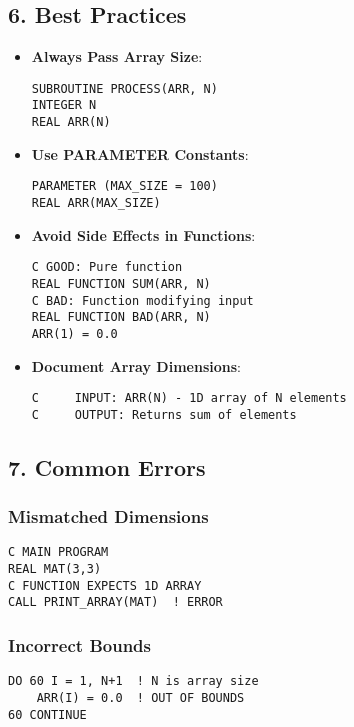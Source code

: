 \documentclass{book}
\begin{document}
\subsection*{6. Best Practices}
\begin{itemize}
\item \textbf{Always Pass Array Size}:
\begin{verbatim}
SUBROUTINE PROCESS(ARR, N)
INTEGER N
REAL ARR(N)
\end{verbatim}

\item \textbf{Use PARAMETER Constants}:
\begin{verbatim}
PARAMETER (MAX_SIZE = 100)
REAL ARR(MAX_SIZE)
\end{verbatim}

\item \textbf{Avoid Side Effects in Functions}:
\begin{verbatim}
C GOOD: Pure function
REAL FUNCTION SUM(ARR, N)
C BAD: Function modifying input
REAL FUNCTION BAD(ARR, N)
ARR(1) = 0.0
\end{verbatim}

\item \textbf{Document Array Dimensions}:
\begin{verbatim}
C     INPUT: ARR(N) - 1D array of N elements
C     OUTPUT: Returns sum of elements
\end{verbatim}
\end{itemize}

\subsection*{7. Common Errors}
\subsubsection*{Mismatched Dimensions}
\begin{verbatim}
C MAIN PROGRAM
REAL MAT(3,3)
C FUNCTION EXPECTS 1D ARRAY
CALL PRINT_ARRAY(MAT)  ! ERROR
\end{verbatim}

\subsubsection*{Incorrect Bounds}
\begin{verbatim}
DO 60 I = 1, N+1  ! N is array size
    ARR(I) = 0.0  ! OUT OF BOUNDS
60 CONTINUE
\end{verbatim}
\end{document}

